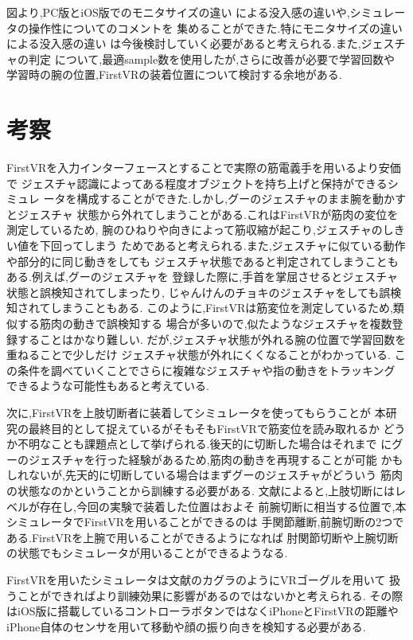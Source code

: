 \documentclass{ltjsreport}
\begin{document}
		図より,PC版とiOS版でのモニタサイズの違い
		による没入感の違いや,シミュレータの操作性についてのコメントを
		集めることができた.特にモニタサイズの違いによる没入感の違い
		は今後検討していく必要があると考えられる.また,ジェスチャの判定
		について,最適sample数を使用したが,さらに改善が必要で学習回数や
		学習時の腕の位置,FirstVRの装着位置について検討する余地がある.


\chapter{考察}
	FirstVRを入力インターフェースとすることで実際の筋電義手を用いるより安価で
	ジェスチャ認識によってある程度オブジェクトを持ち上げと保持ができるシミュレ
	ータを構成することができた.しかし,グーのジェスチャのまま腕を動かすとジェスチャ
	状態から外れてしまうことがある.これはFirstVRが筋肉の変位を測定しているため,
	腕のひねりや向きによって筋収縮が起こり,ジェスチャのしきい値を下回ってしまう
	ためであると考えられる.また,ジェスチャに似ている動作や部分的に同じ動きをしても
	ジェスチャ状態であると判定されてしまうこともある.例えば,グーのジェスチャを
	登録した際に,手首を掌屈させるとジェスチャ状態と誤検知されてしまったり,
	じゃんけんのチョキのジェスチャをしても誤検知されてしまうこともある.
	このように,FirstVRは筋変位を測定しているため,類似する筋肉の動きで誤検知する
	場合が多いので,似たようなジェスチャを複数登録することはかなり難しい.
	だが,ジェスチャ状態が外れる腕の位置で学習回数を重ねることで少しだけ
	ジェスチャ状態が外れにくくなることがわかっている.
	この条件を調べていくことでさらに複雑なジェスチャや指の動きをトラッキング
	できるような可能性もあると考えている.

	次に,FirstVRを上肢切断者に装着してシミュレータを使ってもらうことが
	本研究の最終目的として捉えているがそもそもFirstVRで筋変位を読み取れるか
	どうか不明なことも課題点として挙げられる.後天的に切断した場合はそれまで
	にグーのジェスチャを行った経験があるため,筋肉の動きを再現することが可能
	かもしれないが,先天的に切断している場合はまずグーのジェスチャがどういう
	筋肉の状態なのかということから訓練する必要がある.
	文献\cite{ref:8}によると,上肢切断にはレベルが存在し,今回の実験で装着した位置はおよそ
	前腕切断に相当する位置で,本シミュレータでFirstVRを用いることができるのは
	手関節離断,前腕切断の2つである.FirstVRを上腕で用いることができるようになれば
	肘関節切断や上腕切断の状態でもシミュレータが用いることができるようなる.
	
	FirstVRを用いたシミュレータは文献\cite{ref:3}のカグラのようにVRゴーグルを用いて
	扱うことができればより訓練効果に影響があるのではないかと考えられる.
	その際はiOS版に搭載しているコントローラボタンではなくiPhoneとFirstVRの距離や
	iPhone自体のセンサを用いて移動や顔の振り向きを検知する必要がある.
	
\end{document}
